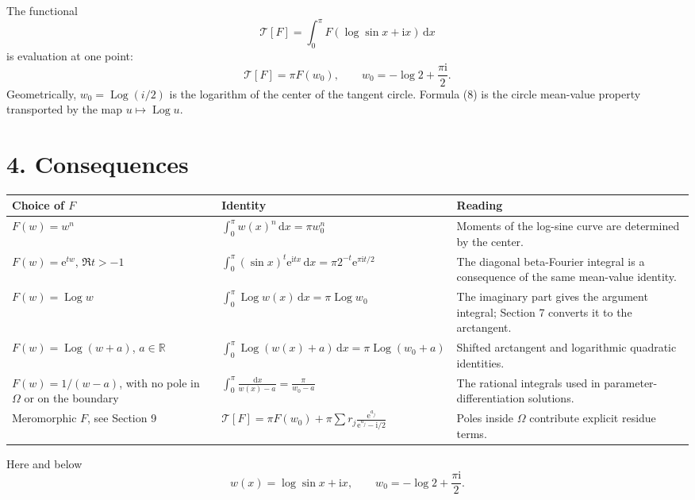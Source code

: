\documentclass[12pt]{article}
\newcommand{\dd}{\,\mathrm{d}}
\newcommand{\ii}{\mathrm{i}}
\newcommand{\e}{\mathrm{e}}
\newcommand{\Log}{\operatorname{Log}}
\begin{document}
The functional
\[
\mathcal T[F]
=\int_0^\pi F(\log\sin x+\ii x)\dd x
\]
is evaluation at one point:
\[
\boxed{\displaystyle
\mathcal T[F]=\pi F(w_0),
\qquad
w_0=-\log2+\frac{\pi\ii}{2}.}
\tag{10}
\]
Geometrically, \(w_0=\Log(i/2)\) is the logarithm of the center of the
tangent circle. Formula (8) is the circle mean-value property transported
by the map \(u\mapsto\Log u\).

\section*{4. Consequences}

\begin{center}
\small
\renewcommand{\arraystretch}{1.45}
\begin{tabularx}{\textwidth}{@{}>{\raggedright\arraybackslash}p{}>{\raggedright\arraybackslash}X>{\raggedright\arraybackslash}p{}@{}}
\toprule
Choice of \(F\) & Identity & Reading \\
\midrule
\(F(w)=w^n\) &
\(\displaystyle
\int_0^\pi w(x)^n\dd x=\pi w_0^n
\) &
Moments of the log-sine curve are determined by the center. \\
\addlinespace
\(F(w)=\e^{tw}\), \(\Re t>-1\) &
\(\displaystyle
\int_0^\pi(\sin x)^t\e^{\ii tx}\dd x
=\pi2^{-t}\e^{\pi\ii t/2}
\) &
The diagonal beta-Fourier integral is a consequence of the same
mean-value identity. \\
\addlinespace
\(F(w)=\Log w\) &
\(\displaystyle
\int_0^\pi\Log w(x)\dd x=\pi\Log w_0
\) &
The imaginary part gives the argument integral; Section 7 converts it to
the arctangent. \\
\addlinespace
\(F(w)=\Log(w+a)\), \(a\in\mathbb R\) &
\(\displaystyle
\int_0^\pi\Log(w(x)+a)\dd x=\pi\Log(w_0+a)
\) &
Shifted arctangent and logarithmic quadratic identities. \\
\addlinespace
\(F(w)=1/(w-a)\), with no pole in \(\Omega\) or on the boundary &
\(\displaystyle
\int_0^\pi\frac{\dd x}{w(x)-a}
=\frac{\pi}{w_0-a}
\) &
The rational integrals used in parameter-differentiation solutions. \\
\addlinespace
Meromorphic \(F\), see Section 9 &
\(\displaystyle
\mathcal T[F]=\pi F(w_0)+\pi\sum r_j\frac{\e^{a_j}}{\e^{a_j}-\ii/2}
\) &
Poles inside \(\Omega\) contribute explicit residue terms. \\
\bottomrule
\end{tabularx}
\end{center}

Here and below
\[
w(x)=\log\sin x+\ii x,
\qquad
w_0=-\log2+\frac{\pi\ii}{2}.
\]
\end{document}
